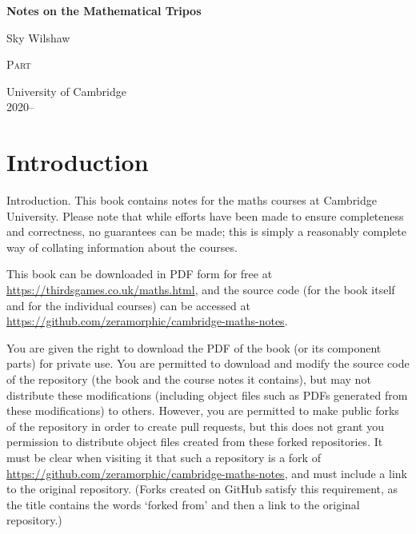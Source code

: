\documentclass{scrbook}
\begin{document}
\begin{titlepage}
	\begin{center}
		\vspace*{1cm}

		\Huge
		\textbf{Notes on the Mathematical Tripos}

		\vspace{0.5cm}
		\LARGE
		Sky Wilshaw

		\vfill

		\Huge
		\textsc{Part \yearnumber}

		\vfill

		\Large
		University of Cambridge\\
		2020--\the\year{}

	\end{center}
\end{titlepage}

\dominitoc{}

\setcounter{tocdepth}{0}
\cleardoubleoddpage
\tableofcontents
\newpage
\setcounter{tocdepth}{3}

\chapter*{Introduction}
Introduction.
\iffalse
This book contains notes for the maths courses at Cambridge University.
Please note that while efforts have been made to ensure completeness and correctness, no guarantees can be made; this is simply a reasonably complete way of collating information about the courses.

This book can be downloaded in PDF form for free at \url{https://thirdsgames.co.uk/maths.html}, and the source code (for the book itself and for the individual courses) can be accessed at \url{https://github.com/zeramorphic/cambridge-maths-notes}.

You are given the right to download the PDF of the book (or its component parts) for private use.
You are permitted to download and modify the source code of the repository (the book and the course notes it contains), but may not distribute these modifications (including object files such as PDFs generated from these modifications) to others.
However, you are permitted to make public forks of the repository in order to create pull requests, but this does not grant you permission to distribute object files created from these forked repositories.
It must be clear when visiting it that such a repository is a fork of \url{https://github.com/zeramorphic/cambridge-maths-notes}, and must include a link to the original repository.
(Forks created on GitHub satisfy this requirement, as the title contains the words `forked from' and then a link to the original repository.)
\end{document}
